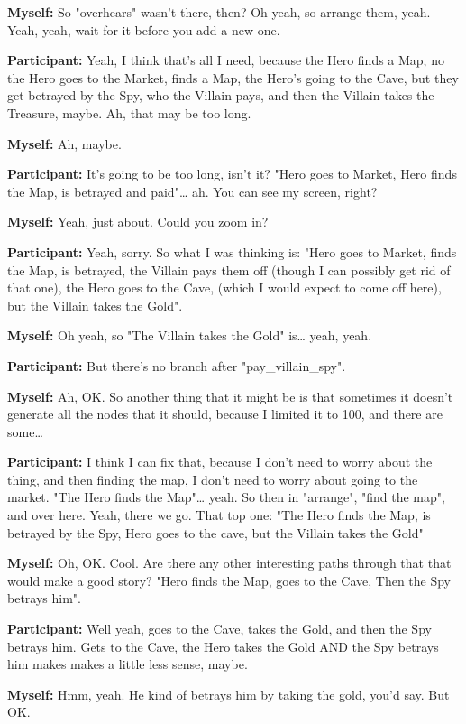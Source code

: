 \documentclass[11pt]{report}
\begin{document}
\begin{linenumbers}
\textbf{Myself:} So "overhears" wasn't there, then? Oh yeah, so arrange them, yeah. Yeah, yeah, wait for it before you add a new one.

\textbf{Participant:} Yeah, I think that's all I need, because the Hero finds a Map, no the Hero goes to the Market, finds a Map, the Hero's going to the Cave, but they get betrayed by the Spy, who the Villain pays, and then the Villain takes the Treasure, maybe. Ah, that may be too long.

\textbf{Myself:} Ah, maybe.

\textbf{Participant:} It's going to be too long, isn't it? "Hero goes to Market, Hero finds the Map, is betrayed and paid"\ldots{} ah. You can see my screen, right?

\textbf{Myself:} Yeah, just about. Could you zoom in?

\textbf{Participant:} Yeah, sorry. So what I was thinking is: "Hero goes to Market, finds the Map, is betrayed, the Villain pays them off (though I can possibly get rid of that one), the Hero goes to the Cave, (which I would expect to come off here), but the Villain takes the Gold".

\textbf{Myself:} Oh yeah, so "The Villain takes the Gold" is\ldots{} yeah, yeah.

\textbf{Participant:} But there's no branch after "pay_villain_spy".

\textbf{Myself:} Ah, OK. So another thing that it might be is that sometimes it doesn't generate all the nodes that it should, because I limited it to 100, and there are some\ldots{}

\textbf{Participant:} I think I can fix that, because I don't need to worry about the thing, and then finding the map, I don't need to worry about going to the market. "The Hero finds the Map"\ldots{} yeah. So then in "arrange", "find the map",  and over here. Yeah, there we go. That top one: "The Hero finds the Map, is betrayed by the Spy, Hero goes to the cave, but the Villain takes the Gold"

\textbf{Myself:} Oh, OK. Cool. Are there any other interesting paths through that that would make a good story? "Hero finds the Map, goes to the Cave, Then the Spy betrays him".

\textbf{Participant:} Well yeah, goes to the Cave, takes the Gold, and then the Spy betrays him. Gets to the Cave, the Hero takes the Gold AND the Spy betrays him makes makes a little less sense, maybe.

\textbf{Myself:} Hmm, yeah. He kind of betrays him by taking the gold, you'd say. But OK.


\end{linenumbers}
\end{document}
